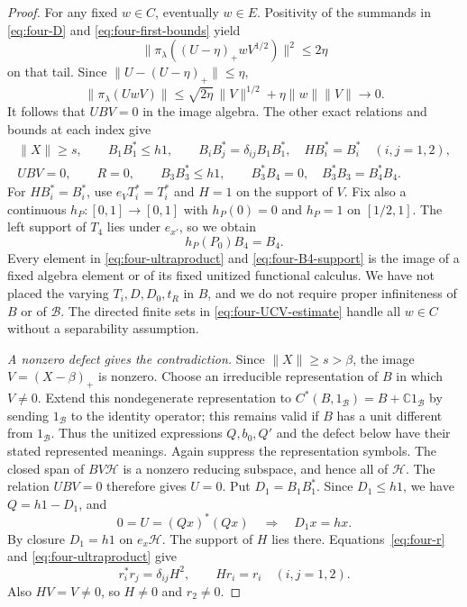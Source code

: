 \begin{proof}
For any fixed \(w\in C\), eventually \(w\in E\).  Positivity
of the summands in \eqref{eq:four-D} and
\eqref{eq:four-first-bounds} yield
\[
 \|\pi_\lambda((U-\eta)_+wV^{1/2})\|^2\le2\eta
\]
on that tail.  Since \(\|U-(U-\eta)_+\|\le\eta\),
\begin{equation}\label{eq:four-UCV-estimate}
 \|\pi_\lambda(UwV)\|
 \le\sqrt{2\eta}\,\|V\|^{1/2}
      +\eta\|w\|\|V\|\longrightarrow0.
\end{equation}
It follows that \(UBV=0\) in the image algebra.  The other exact
relations and bounds at each index give
\begin{equation}\label{eq:four-ultraproduct}
 \begin{gathered}
 \|X\|\ge s,\qquad B_1B_1^*\le h1,\qquad
 B_iB_j^*=\delta_{ij}B_1B_1^*,\quad HB_i^*=B_i^*
       \quad(i,j=1,2),\\
 UBV=0,\qquad R=0,\qquad B_3B_3^*\le h1,\qquad
 B_3^*B_4=0,\quad B_3^*B_3=B_4^*B_4.
 \end{gathered}
\end{equation}
For \(HB_i^*=B_i^*\), use \(e_VT_i^*=T_i^*\) and
\(H=1\) on the support of \(V\).
Fix also a continuous \(h_P:[0,1]\to[0,1]\) with
\(h_P(0)=0\) and \(h_P=1\) on \([1/2,1]\).  The left
support of \(T_4\) lies under \(e_{x'}\), so we obtain
\begin{equation}\label{eq:four-B4-support}
 h_P(P_0)B_4=B_4.
\end{equation}
Every element in \eqref{eq:four-ultraproduct} and
\eqref{eq:four-B4-support} is the image of a fixed algebra
element or of its fixed unitized functional calculus.  We have
not placed the varying \(T_i,D,D_0,t_R\) in \(B\), and we do
not require proper infiniteness of \(B\) or of \(\mathcal B\).
The directed finite sets in \eqref{eq:four-UCV-estimate} handle
all \(w\in C\) without a separability assumption.

\medskip\noindent\emph{A nonzero defect gives the contradiction.}
Since \(\|X\|\ge s>\beta\), the image \(V=(X-\beta)_+\)
is nonzero.  Choose an irreducible representation of \(B\)
in which \(V\ne0\).  Extend this nondegenerate representation
to \(C^*(B,1_{\mathcal B})=B+\mathbb C1_{\mathcal B}\) by
sending \(1_{\mathcal B}\) to the identity operator; this remains
valid if \(B\) has a unit different from \(1_{\mathcal B}\).
Thus the unitized expressions \(Q,b_0,Q'\) and the defect below
have their stated represented meanings.  Again suppress the
representation symbols.  The closed span of \(BV\mathcal H\) is a nonzero
reducing subspace, and hence all of \(\mathcal H\).
The relation \(UBV=0\) therefore gives \(U=0\).
Put \(D_1=B_1B_1^*\).  Since \(D_1\le h1\), we have
\(Q=h1-D_1\), and
\[
 0=U=(Qx)^*(Qx)
 \quad\Longrightarrow\quad D_1x=hx.
\]
By closure \(D_1=h1\) on \(e_x\mathcal H\).  The support of
\(H\) lies there.  Equations~\eqref{eq:four-r} and
\eqref{eq:four-ultraproduct} give
\begin{equation}\label{eq:four-isometry-relations}
 r_i^*r_j=\delta_{ij}H^2,\qquad Hr_i=r_i
 \quad(i,j=1,2).
\end{equation}
Also \(HV=V\ne0\), so \(H\ne0\) and \(r_2\ne0\).


\end{proof}
